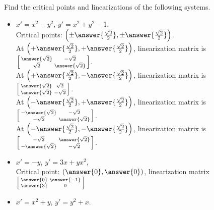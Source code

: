 \documentclass{ximera}
\begin{document}
\begin{exercise}
    Find the critical points and linearizations of the following systems.
    \begin{itemize}
        \item $x'=x^2-y^2$, \enspace $y'=x^2+y^2-1$,\\
            Critical points: $\left(\pm \answer{\frac{\sqrt{2}}{2}}, \pm \answer{\frac{\sqrt{2}}{2}}\right)$. \\
            At $\left(+\answer{\frac{\sqrt{2}}{2}}, +\answer{\frac{\sqrt{2}}{2}}\right)$, linearization matrix is $\left[\begin{smallmatrix} \answer{\sqrt{2}} & -\sqrt{2} \\ \sqrt{2} & \answer{\sqrt{2}} \end{smallmatrix}\right]$. \\
            At $\left(+\answer{\frac{\sqrt{2}}{2}}, -\answer{\frac{\sqrt{2}}{2}}\right)$, linearization matrix is $\left[\begin{smallmatrix} \answer{\sqrt{2}} & \sqrt{2} \\ \answer{\sqrt{2}} & -\sqrt{2} \end{smallmatrix}\right]$.\\
            At $\left(-\answer{\frac{\sqrt{2}}{2}}, +\answer{\frac{\sqrt{2}}{2}}\right)$, linearization matrix is $\left[\begin{smallmatrix} -\answer{\sqrt{2}} & -\sqrt{2} \\ -\sqrt{2} & \answer{\sqrt{2}} \end{smallmatrix}\right]$. \\
            At $\left(-\answer{\frac{\sqrt{2}}{2}}, -\answer{\frac{\sqrt{2}}{2}}\right)$, linearization matrix is $\left[\begin{smallmatrix} -\sqrt{2} & \answer{\sqrt{2}} \\ -\answer{\sqrt{2}} & -\sqrt{2} \end{smallmatrix}\right]$. \\
        \item $x'=-y$, \enspace $y'=3x+yx^2$,\\
            Critical point: $\left(\answer{0},\answer{0}\right)$, linearization matrix $\left[\begin{smallmatrix} \answer{0} & \answer{-1} \\ \answer{3} & 0 \end{smallmatrix}\right]$\\
        \item $x'=x^2+y$, \enspace $y'=y^2+x$.\\

\end{itemize}
\end{exercise}
\end{document}
